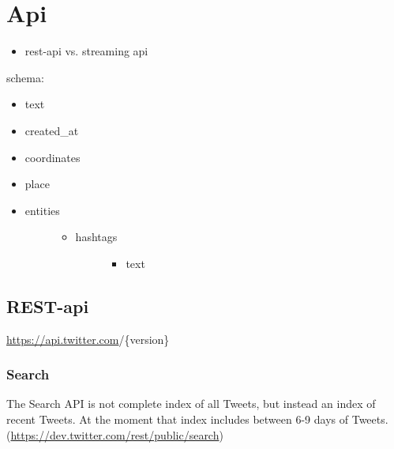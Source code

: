 \documentclass[letterpaper,10pt,english]{sphinxmanual}
\begin{document}
\section{Api}
\label{twitter:api}\begin{itemize}
\item {} 
rest-api vs. streaming api

\end{itemize}

schema:
\begin{itemize}
\item {} 
text

\item {} 
created\_at

\item {} 
coordinates

\item {} 
place

\item {} \begin{description}
\item[{entities}] \leavevmode\begin{itemize}
\item {} \begin{description}
\item[{hashtags}] \leavevmode\begin{itemize}
\item {} 
text

\end{itemize}

\end{description}

\end{itemize}

\end{description}

\end{itemize}


\subsection{REST-api}
\label{twitter:rest-api}
\href{https://api.twitter.com}{https://api.twitter.com}/\{version\}


\subsubsection{Search}
\label{twitter:search}
The Search API is not complete index of all Tweets, but instead an index of recent Tweets.
At the moment that index includes between 6-9 days of Tweets. (\href{https://dev.twitter.com/rest/public/search}{https://dev.twitter.com/rest/public/search})
\end{document}
